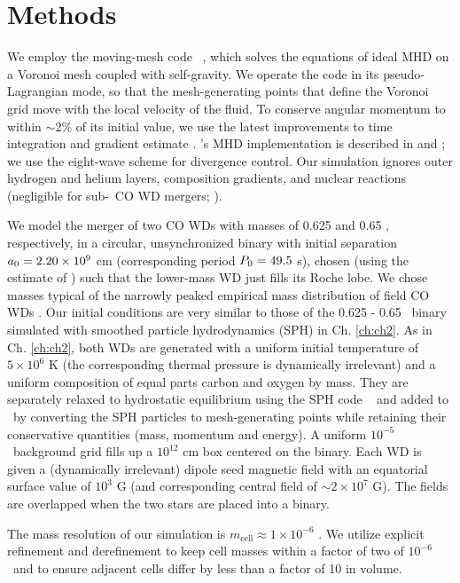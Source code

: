 \section{Methods} 
\label{sec:c4_codes}

We employ the moving-mesh code \arepo\ \citep{spri10}, which solves the equations of ideal MHD on a Voronoi mesh coupled with self-gravity.  We operate the code in its pseudo-Lagrangian mode, so that the mesh-generating points that define the Voronoi grid move with the local velocity of the fluid.  To conserve angular momentum to within $\sim2$\% of its initial value, we use the latest improvements to time integration and gradient estimate \citep{pakm+16}.  \arepo's MHD implementation is described in \cite{pakmbs11} and \cite{pakms13}; we use the \cite{powe+99} eight-wave scheme for divergence control.  Our simulation ignores outer hydrogen and helium layers, composition gradients, and nuclear reactions (negligible for sub-\Mch\ CO WD mergers; \citealt{loreig09,rask+12}).

We model the merger of two CO WDs with masses of 0.625 and 0.65 \Msun, respectively, in a circular, unsynchronized binary with initial separation $\azero = 2.20\times10^9$ cm (corresponding period $\pzero = 49.5$ s), chosen (using the estimate of \citealt{eggl83}) such that the lower-mass WD just fills its Roche lobe.  We chose masses typical of the narrowly peaked empirical mass distribution of field CO WDs \citep{klei+13}.  Our initial conditions are very similar to those of the 0.625 - 0.65 \Msun\ binary simulated with smoothed particle hydrodynamics (SPH) in Ch. \ref{ch:ch2}.  As in Ch. \ref{ch:ch2}, both WDs are generated with a uniform initial temperature of $5\times10^6$ K (the corresponding thermal pressure is dynamically irrelevant) and a uniform composition of equal parts carbon and oxygen by mass.  They are separately relaxed to hydrostatic equilibrium using the SPH code \gasoline\ \citep{wadssq04} and added to \arepo\ by converting the SPH particles to mesh-generating points while retaining their conservative quantities (mass, momentum and energy).  A uniform $10^{-5}$ \gcc\ background grid fills up a $10^{12}$ cm box centered on the binary. Each WD is given a (dynamically irrelevant) dipole seed magnetic field with an equatorial surface value of $10^3$ G (and corresponding central field of $\sim2\times10^7$ G). The fields are overlapped when the two stars are placed into a binary.

The mass resolution of our simulation is $m_\mathrm{cell} \approx 1\times10^{-6}$ \Msun.  We utilize explicit refinement and derefinement \citep{voge+12} to keep cell masses within a factor of two of $10^{-6}$ \Msun\ and to ensure adjacent cells differ by less than a factor of 10 in volume.

